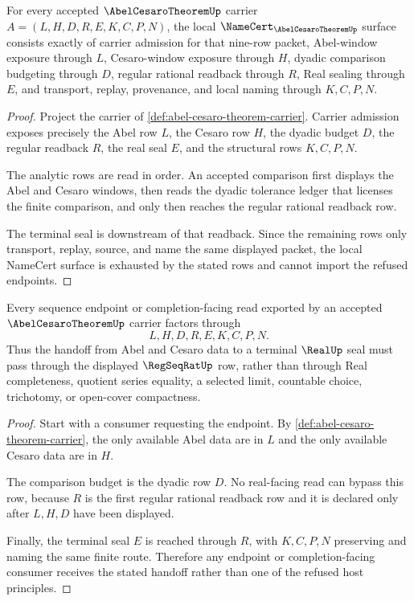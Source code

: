 \begin{theorem}
\label{thm:abel-cesaro-theorem-namecert-obligations}
For every accepted $\AbelCesaroTheoremUp$ carrier $A=(L,H,D,R,E,K,C,P,N)$, the local $\NameCert_{\AbelCesaroTheoremUp}$ surface consists exactly of carrier admission for that nine-row packet, Abel-window exposure through $L$, Cesaro-window exposure through $H$, dyadic comparison budgeting through $D$, regular rational readback through $R$, Real sealing through $E$, and transport, replay, provenance, and local naming through $K,C,P,N$.
\end{theorem}
\begin{proof}
Project the carrier of \autoref{def:abel-cesaro-theorem-carrier}. Carrier admission exposes precisely the Abel row $L$, the Cesaro row $H$, the dyadic budget $D$, the regular readback $R$, the real seal $E$, and the structural rows $K,C,P,N$.

The analytic rows are read in order. An accepted comparison first displays the Abel and Cesaro windows, then reads the dyadic tolerance ledger that licenses the finite comparison, and only then reaches the regular rational readback row.

The terminal seal is downstream of that readback. Since the remaining rows only transport, replay, source, and name the same displayed packet, the local NameCert surface is exhausted by the stated rows and cannot import the refused endpoints.
\end{proof}

\begin{theorem}
\label{thm:abel-cesaro-theorem-regular-handoff}
Every sequence endpoint or completion-facing read exported by an accepted $\AbelCesaroTheoremUp$ carrier factors through
$$
L,H,D,R,E,K,C,P,N.
$$
Thus the handoff from Abel and Cesaro data to a terminal $\RealUp$ seal must pass through the displayed $\RegSeqRatUp$ row, rather than through Real completeness, quotient series equality, a selected limit, countable choice, trichotomy, or open-cover compactness.
\end{theorem}
\begin{proof}
Start with a consumer requesting the endpoint. By \autoref{def:abel-cesaro-theorem-carrier}, the only available Abel data are in $L$ and the only available Cesaro data are in $H$.

The comparison budget is the dyadic row $D$. No real-facing read can bypass this row, because $R$ is the first regular rational readback row and it is declared only after $L,H,D$ have been displayed.

Finally, the terminal seal $E$ is reached through $R$, with $K,C,P,N$ preserving and naming the same finite route. Therefore any endpoint or completion-facing consumer receives the stated handoff rather than one of the refused host principles.
\end{proof}


